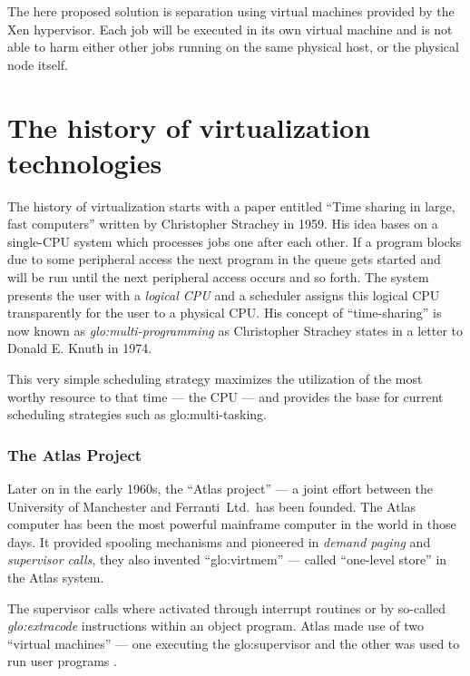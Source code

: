 The here  proposed solution is separation using  virtual machines provided
by  the Xen  hypervisor. Each  job  will be  executed in  its own  virtual
machine and  is not  able to harm  either other  jobs running on  the same
physical host, or the physical node itself.

\section{The history of virtualization technologies}
\label{sec:virtualization-history}

The history of virtualization starts  with a paper entitled ``Time sharing
in  large,  fast  computers''  \cite{Strachey59}  written  by  Christopher
Strachey in  1959. His idea bases  on a single-CPU  system which processes
jobs one  after each  other. If  a program blocks  due to  some peripheral
access the  next program in the queue  gets started and will  be run until
the next peripheral  access occurs and so forth.   The system presents the
user with  a \emph{logical CPU} and  a scheduler assigns  this logical CPU
transparently  for   the  user  to   a  physical  CPU.   His   concept  of
``time-sharing''  is now  known  as \emph{\gls{glo:multi-programming}}  as
Christopher Strachey states in a letter to Donald E. Knuth in 1974.

This very simple scheduling strategy maximizes the utilization of the most
worthy resource  to that time  --- the CPU  --- and provides the  base for
current scheduling strategies such as \gls{glo:multi-tasking}.

\subsubsection{The Atlas Project}

Later on  in the  early 1960s,  the ``Atlas project''  --- a  joint effort
between the  University of Manchester and  Ferranti~Ltd.~has been founded.
The Atlas  computer has been the  most powerful mainframe  computer in the
world in  those days.   It provided spooling  mechanisms and  pioneered in
\emph{demand  paging}  and  \emph{supervisor  calls}, they  also  invented
``\gls{glo:virtmem}'' --- called ``one-level store'' in
the Atlas system.

The  supervisor calls  where activated  through interrupt  routines  or by
so-called   \emph{\gls{glo:extracode}}  instructions   within   an  object
program.  Atlas made use of two ``virtual machines'' --- one executing the
\gls{glo:supervisor}  and  the  other   was  used  to  run  user  programs
\cite{virtualization-overview}.

